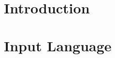 \documentclass{report}[10pt]
\begin{document}
\sloppypar




\tableofcontents

\chapter{Introduction}
\label{Introduction}

\chapter{Input Language}
\label{Input Language}







\newpage
\appendix




\cleardoublepage

\printindex[com]
\printindex[var]
\printindex
\end{document}
